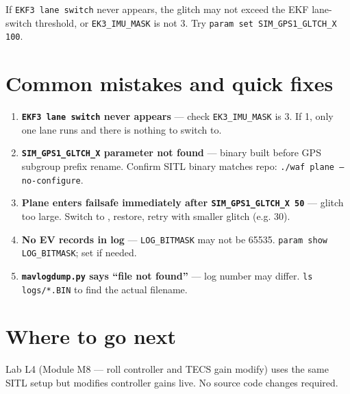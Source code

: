 \documentclass[a4paper,11pt,twoside]{article}
\begin{document}
If \texttt{EKF3 lane switch} never appears, the glitch may not exceed the EKF lane-switch threshold, or \texttt{EK3\_IMU\_MASK} is not 3. Try \texttt{param set SIM\_GPS1\_GLTCH\_X 100}.

\section*{Common mistakes and quick fixes}

\begin{enumerate}
  \item \textbf{\texttt{EKF3 lane switch} never appears} --- check \texttt{EK3\_IMU\_MASK} is 3. If 1, only one lane runs and there is nothing to switch to.
  \item \textbf{\texttt{SIM\_GPS1\_GLTCH\_X} parameter not found} --- binary built before GPS subgroup prefix rename. Confirm SITL binary matches repo: \texttt{./waf plane --no-configure}.
  \item \textbf{Plane enters failsafe immediately after \texttt{SIM\_GPS1\_GLTCH\_X 50}} --- glitch too large. Switch to , restore, retry with smaller glitch (e.g. 30).
  \item \textbf{No EV records in log} --- \texttt{LOG\_BITMASK} may not be 65535. \texttt{param show LOG\_BITMASK}; set if needed.
  \item \textbf{\texttt{mavlogdump.py} says ``file not found''} --- log number may differ. \texttt{ls logs/*.BIN} to find the actual filename.
\end{enumerate}

\section*{Where to go next}

Lab L4 (Module M8 --- roll controller and TECS gain modify) uses the same SITL setup but modifies controller gains live. No source code changes required.

\fi
\end{document}
